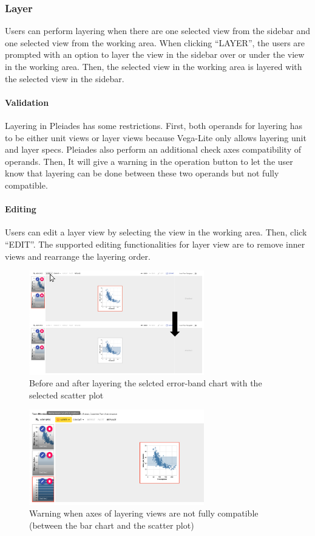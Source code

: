 \documentclass[journal]{vgtc}                %
\begin{document}
\subsubsection{Layer}
Users can perform layering when there are one selected view from the sidebar and
one selected view from the working area. When clicking “LAYER”, the users are
prompted with an option to layer the view in the sidebar over or under the view
in the working area. Then, the selected view in the working area is layered with
the selected view in the sidebar.

\paragraph{Validation} Layering in Pleiades has some restrictions. First, both
operands for layering has to be either unit views or layer views because
Vega-Lite only allows layering unit and layer specs. Pleiades also perform an
additional check axes compatibility of operands. Then, It will give a warning
in the operation button to let the user know that layering can be done between
these two operands but not fully compatible.

\paragraph{Editing} Users can edit a layer view by selecting the view in the
working area. Then, click “EDIT”. The supported editing functionalities for layer
view are to remove inner views and rearrange the layering order.

\begin{figure}[htb]
 \centering
 \includegraphics[width=3in]{layer.png}
 \caption{Before and after layering the selcted error-band chart with the selected scatter plot}
\end{figure}

\begin{figure}[htb]
 \centering
 \includegraphics[width=3in]{layer_warn.png}
 \caption{Warning when axes of layering views are not fully compatible (between the bar chart and the scatter plot)}
\end{figure}
\end{document}
